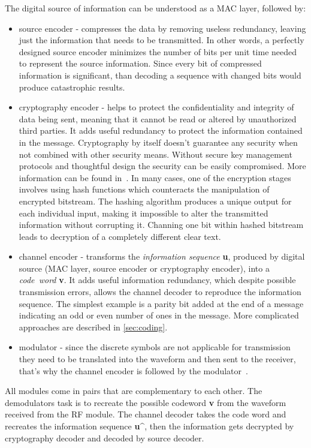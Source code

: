 The digital source of information can be understood as a MAC layer, followed by:
\begin{itemize}
    \item source encoder - compresses the data by removing useless redundancy, leaving just the information that needs to be transmitted. In other words, a perfectly designed source encoder minimizes the number of bits per unit time needed to represent the source information. Since every bit of compressed information is significant, than decoding a sequence with changed bits would produce catastrophic results.
    \item cryptography encoder - helps to protect the confidentiality and integrity of data being sent, meaning that it cannot be read or altered by unauthorized third parties. It adds useful redundancy to protect the information contained in the message. Cryptography by itself doesn't guarantee any security when not combined with other security means. Without secure key management protocols and thoughtful design the security can be easily compromised. More information can be found in~\cite{Cryptography}. In many cases, one of the encryption stages involves using hash functions which counteracts the manipulation of encrypted bitstream. The hashing algorithm produces a unique output for each individual input, making it impossible to alter the transmitted information without corrupting it. Channing one bit within hashed bitstream leads to decryption of a completely different clear text.
    \item channel encoder - transforms the \textit{information sequence} \textbf{u}, produced by digital source (MAC layer, source encoder or cryptography encoder), into a \textit{code~word} \textbf{v}. It adds useful information redundancy, which despite possible transmission errors, allows the channel decoder to reproduce the information sequence. The simplest example is a parity bit added at the end of a message indicating an odd or even number of ones in the message. More complicated approaches are described in \autoref{sec:coding}.
    \item modulator - since the discrete symbols are not applicable for transmission they need to be translated into the waveform and then sent to the receiver, that's why the channel encoder is followed by the modulator~\cite{book:LinCostello}.
\end{itemize}
All modules come in pairs that are complementary to each other. The demodulators task is to recreate the possible codeword \textbf{v} from the waveform received from the RF module. The channel decoder takes the code word and recreates the information sequence \textbf{u\^}, then the information gets decrypted by cryptography decoder and decoded by source decoder.



